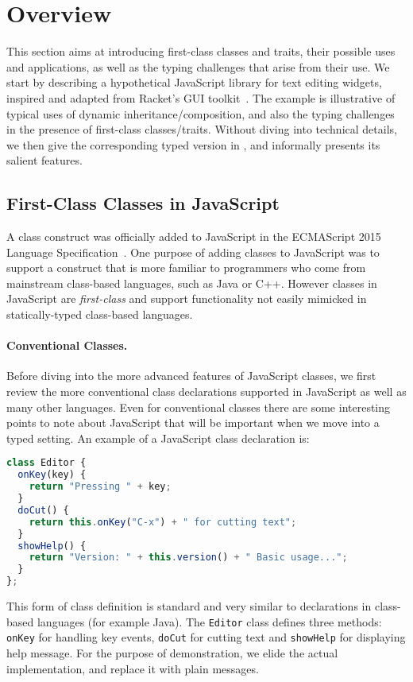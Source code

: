 
\section{Overview}
\label{sec:trait:overview}

This section aims at introducing first-class classes and traits, their possible
uses and applications, as well as the typing challenges that arise
from their use.
We start by describing a hypothetical JavaScript library for text editing
widgets, inspired and adapted from Racket's GUI
toolkit~\citep{DBLP:conf/oopsla/TakikawaSDTF12}. The example is illustrative of
typical uses of dynamic inheritance/composition, and also the typing challenges
in the presence of first-class classes/traits. Without diving into
technical details, we then give the corresponding typed version in
\sedel, and informally presents its salient features.

\subsection{First-Class Classes in JavaScript}

A class construct was officially added to JavaScript in the ECMAScript
2015 Language Specification~\citep{EcmaScript:15}. One purpose of
adding classes to JavaScript was to support a construct that is more
familiar to programmers who come from mainstream class-based languages,
such as Java or C++. However classes in JavaScript are
\emph{first-class} and support functionality not easily mimicked in
statically-typed class-based languages.

\paragraph{Conventional Classes.}

Before diving into the more advanced features of JavaScript classes, we first
review the more conventional class declarations supported in JavaScript as well
as many other languages. Even for conventional classes there are some
interesting points to note about JavaScript that will be important when we move
into a typed setting. An example of a JavaScript class declaration is:
\begin{lstlisting}[language=JavaScript]
class Editor {
  onKey(key) {
    return "Pressing " + key;
  }
  doCut() {
    return this.onKey("C-x") + " for cutting text";
  }
  showHelp() {
    return "Version: " + this.version() + " Basic usage...";
  }
};
\end{lstlisting}
This form of class definition is standard and very similar to declarations in
class-based languages (for example Java). The \lstinline{Editor} class
defines three methods: \lstinline{onKey} for handling key events,
\lstinline{doCut} for cutting text and \lstinline{showHelp} for displaying help
message. For the purpose of demonstration, we elide the actual implementation,
and replace it with plain messages.

